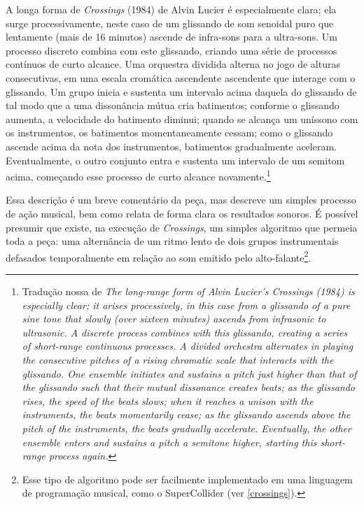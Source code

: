\begin{citacao}
A longa forma de \emph{Crossings} (1984) de Alvin Lucier é especialmente clara; ela surge processivamente, neste caso de um glissando de som senoidal puro que lentamente (mais de 16 minutos) ascende de infra-sons para a ultra-sons. Um processo discreto combina com este glissando, criando uma série de processos contínuos de curto alcance. Uma orquestra dividida alterna no jogo de alturas consecutivas, em uma escala cromática ascendente ascendente que interage com o glissando. Um grupo inicia e sustenta um intervalo acima daquela do glissando de tal modo que a uma dissonância mútua cria batimentos; conforme o glissando aumenta, a velocidade do batimento diminui; quando se alcança um uníssono com os instrumentos, os batimentos momentaneamente cessam; como o glissando ascende acima da nota dos instrumentos, batimentos gradualmente aceleram. Eventualmente, o outro conjunto entra e sustenta um intervalo de um semitom acima, começando esse processo de curto alcance novamente.\cite[p.~128]{mailman_agency_2013}\footnote{Tradução nossa de \emph{The long-range form of Alvin Lucier’s Crossings (1984) is especially clear; it arises processively, in this case from a glissando of a pure sine tone that slowly (over sixteen minutes) ascends from infrasonic to ultrasonic. A discrete process combines with this glissando, creating a series of short-range continuous processes. A divided orchestra alternates in playing the consecutive pitches of a rising chromatic scale that interacts with the glissando. One ensemble initiates and sustains a pitch just higher than that of the glissando such that their mutual dissonance creates beats; as the glissando rises, the speed of the beats slows; when it reaches a unison with the instruments, the beats momentarily cease; as the glissando ascends above the pitch of the instruments, the beats gradually accelerate. Eventually, the other ensemble enters and sustains a pitch a semitone higher, starting this short-range process again.}}
\end{citacao}

Essa descrição é um breve comentário da peça, mas descreve um simples processo de ação musical, bem como relata de forma clara os resultados sonoros. É possível presumir que existe, na execução de \emph{Crossings}, um simples algoritmo que permeia toda a peça: uma alternância de um ritmo lento de dois grupos instrumentais defasados temporalmente em relação ao som emitido pelo alto-falante\footnote{Esse tipo de algoritmo pode ser facilmente implementado em uma linguagem de programação musical, como o SuperCollider (ver \autoref{crossings}).}.

